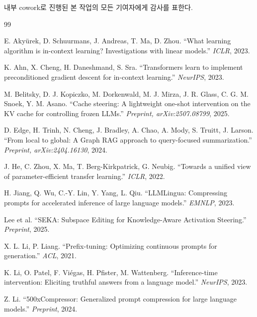 \documentclass[11pt]{article}
\theoremstyle{definition}
\begin{document}
내부 cowork로 진행된 본 작업의 모든 기여자에게 감사를 표한다.


\begin{thebibliography}{99}

E. Akyürek, D. Schuurmans, J. Andreas, T. Ma, D. Zhou.
``What learning algorithm is in-context learning? Investigations with linear models.''
\emph{ICLR}, 2023.

K. Ahn, X. Cheng, H. Daneshmand, S. Sra.
``Transformers learn to implement preconditioned gradient descent for in-context learning.''
\emph{NeurIPS}, 2023.

M. Belitsky, D. J. Kopiczko, M. Dorkenwald, M. J. Mirza, J. R. Glass, C. G. M. Snoek, Y. M. Asano.
``Cache steering: A lightweight one-shot intervention on the KV cache for controlling frozen LLMs.''
\emph{Preprint, arXiv:2507.08799}, 2025.

D. Edge, H. Trinh, N. Cheng, J. Bradley, A. Chao, A. Mody, S. Truitt, J. Larson.
``From local to global: A Graph RAG approach to query-focused summarization.''
\emph{Preprint, arXiv:2404.16130}, 2024.

J. He, C. Zhou, X. Ma, T. Berg-Kirkpatrick, G. Neubig.
``Towards a unified view of parameter-efficient transfer learning.''
\emph{ICLR}, 2022.

H. Jiang, Q. Wu, C.-Y. Lin, Y. Yang, L. Qiu.
``LLMLingua: Compressing prompts for accelerated inference of large language models.''
\emph{EMNLP}, 2023.

Lee et al.
``SEKA: Subspace Editing for Knowledge-Aware Activation Steering.''
\emph{Preprint}, 2025.

X. L. Li, P. Liang.
``Prefix-tuning: Optimizing continuous prompts for generation.''
\emph{ACL}, 2021.

K. Li, O. Patel, F. Viégas, H. Pfister, M. Wattenberg.
``Inference-time intervention: Eliciting truthful answers from a language model.''
\emph{NeurIPS}, 2023.

Z. Li.
``500xCompressor: Generalized prompt compression for large language models.''
\emph{Preprint}, 2024.


\end{thebibliography}
\end{document}
